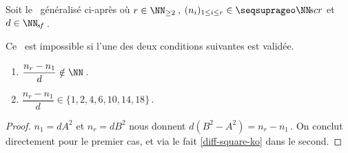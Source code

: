 \newpage
\begin{fact} \label{sftable-illegal-0-sol}
	Soit le \sftab\ généralisé ci-après où
	$r \in \NN_{\geq 2}$\,,
	$( n_i )_{1 \leq i \leq r} \in \NNseq[r]$
	et
	$d \in \NNsf$\,.

    \begin{center}
    \end{center}

	Ce \sftab\ est impossible si l'une des deux conditions suivantes est validée.
	
	\begin{enumerate}
		\item $\dfrac{n_r - n_1}{d} \notin \NN$\,.

		\item $\dfrac{n_r - n_1}{d} \in \{ 1, 2, 4, 6, 10, 14, 18 \}$\,.
	\end{enumerate}
\end{fact}


\begin{proof}
	$n_1 = d A^2$ et $n_r = d B^2$ nous donnent $d (B^2 - A^2) = n_r - n_1$\,. On conclut directement pour le premier cas, et via le fait \ref{diff-square-ko} dans le second.
\end{proof}

